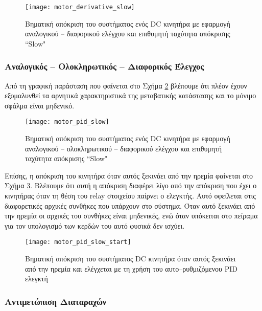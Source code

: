 \begin{figure}[h]
  \centering
  \texttt{[image: motor\_derivative\_slow]}
  \caption{Βηματική απόκριση του συστήματος ενός DC κινητήρα με εφαρμογή αναλογικού  --  διαφορικού ελέγχου και επιθυμητή ταχύτητα απόκρισης ``Slow"}
  \label{fig:motor_derivative_slow}
\end{figure}

\subsubsection{Αναλογικός  --  Ολοκληρωτικός  --  Διαφορικός Έλεγχος}

Από τη γραφική παράσταση που φαίνεται στο Σχήμα \ref{fig:motor_pid_slow} βλέπουμε ότι πλέον έχουν εξομαλυνθεί τα αρνητικά χαρακτηριστικά της μεταβατικής κατάστασης και το μόνιμο σφάλμα είναι μηδενικό.

\begin{figure}[h]
  \centering
  \texttt{[image: motor\_pid\_slow]}
  \caption{Βηματική απόκριση του συστήματος ενός DC κινητήρα με εφαρμογή αναλογικού  --  ολοκληρωτικού  --  διαφορικού ελέγχου και επιθυμητή ταχύτητα απόκρισης ``Slow"}
  \label{fig:motor_pid_slow}
\end{figure}

Επίσης, η απόκριση του κινητήρα όταν αυτός ξεκινάει από την ηρεμία φαίνεται στο Σχήμα \ref{fig:motor_pid_slow_start}. Βλέπουμε ότι αυτή η απόκριση διαφέρει λίγο από την απόκριση που έχει ο κινητήρας όταν τη θέση του relay στοιχείου παίρνει ο ελεγκτής. Αυτό οφείλεται στις διαφορετικές αρχικές συνθήκες που υπάρχουν στο σύστημα. Όταν αυτό ξεκινάει από την ηρεμία οι αρχικές του συνθήκες είναι μηδενικές, ενώ όταν υπόκειται στο πείραμα για τον υπολογισμό των κερδών του αυτό φυσικά δεν ισχύει.

\begin{figure}[h]
  \centering
  \texttt{[image: motor\_pid\_slow\_start]}
  \caption{Βηματική απόκριση του συστήματος DC κινητήρα όταν αυτός ξεκινάει από την ηρεμία και ελέγχεται με τη χρήση του αυτο--ρυθμιζόμενου PID ελεγκτή}
  \label{fig:motor_pid_slow_start}
\end{figure}

\subsubsection{Αντιμετώπιση Διαταραχών}

